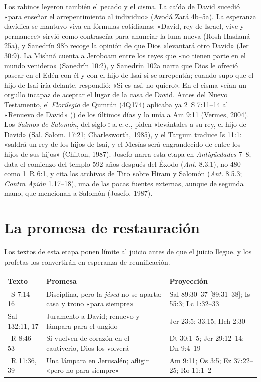 Los rabinos leyeron también el pecado y el cisma. La caída de David sucedió «para enseñar el arrepentimiento al individuo» (Avodá Zará 4b--5a). La esperanza davídica se mantuvo viva en fórmulas cotidianas: «David, rey de Israel, vive y permanece» sirvió como contraseña para anunciar la luna nueva (Rosh Hashaná 25a), y Sanedrín 98b recoge la opinión de que Dios «levantará otro David» (Jer 30:9). La Mishná cuenta a Jeroboam entre los reyes que «no tienen parte en el mundo venidero» (Sanedrín 10:2), y Sanedrín 102a narra que Dios le ofreció pasear en el Edén con él y con el hijo de Isaí si se arrepentía; cuando supo que el hijo de Isaí iría delante, respondió: «Si es así, no quiero». En el cisma veían un orgullo incapaz de aceptar el lugar de la casa de David. Antes del Nuevo Testamento, el \emph{Florilegio} de Qumrán (4Q174) aplicaba ya 2~S 7:11--14 al «Renuevo de David» () de los últimos días y lo unía a Am 9:11 (Vermes, 2004). Los \emph{Salmos de Salomón}, del siglo \textsc{i} a.\,e.\,c., piden «levántales a su rey, el hijo de David» (Sal. Salom. 17:21; Charlesworth, 1985), y el Targum traduce Is 11:1: «saldrá un rey de los hijos de Isaí, y el Mesías será engrandecido de entre los hijos de sus hijos» (Chilton, 1987). Josefo narra esta etapa en \emph{Antigüedades} 7--8; data el comienzo del templo 592 años después del Éxodo (\emph{Ant.} 8.3.1), no 480 como 1~R 6:1, y cita los archivos de Tiro sobre Hiram y Salomón (\emph{Ant.} 8.5.3; \emph{Contra Apión} 1.17--18), una de las pocas fuentes externas, aunque de segunda mano, que mencionan a Salomón (Josefo, 1987).

\section{La promesa de restauración}

Los textos de esta etapa ponen límite al juicio antes de que el juicio llegue, y los profetas los convertirán en esperanza de reunificación.

\begin{center}\small
\renewcommand{\arraystretch}{1.25}
\begin{tabular}{>{\RaggedRight\arraybackslash}p{2.5cm}>{\RaggedRight\arraybackslash}p{5.5cm}>{\RaggedRight\arraybackslash}p{5.9cm}}
\toprule
\textbf{Texto} & \textbf{Promesa} & \textbf{Proyección}\\
\midrule
2~S 7:14--16 & Disciplina, pero la \emph{jésed} no se aparta; casa y trono «para siempre» & Sal 89:30--37 [89:31--38]; Is 55:3; Lc 1:32--33\\
Sal 132:11, 17 & Juramento a David; renuevo y lámpara para el ungido & Jer 23:5; 33:15; Hch 2:30\\
1~R 8:46--53 & Si vuelven de corazón en el cautiverio, Dios los volverá & Dt 30:1--5; Jer 29:12--14; Dn 9:4--19\\
1~R 11:36, 39 & Una lámpara en Jerusalén; afligir «pero no para siempre» & Am 9:11; Os 3:5; Ez 37:22--25; Ro 11:1--2\\
\bottomrule
\end{tabular}\end{center}

